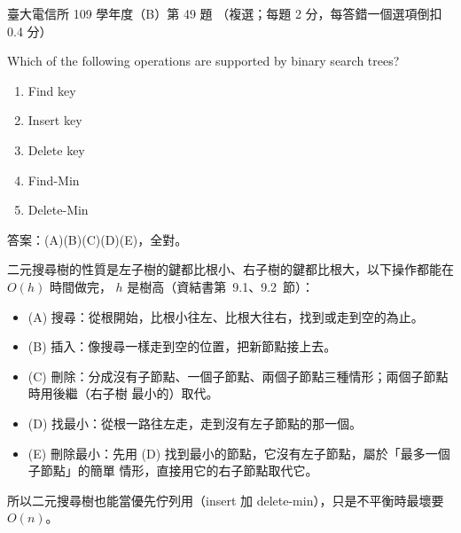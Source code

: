 \begin{pastexam}[label={px:ntu-109-comm-dsa-49}]{臺大電信所 109 學年度（B）第 49 題}
（複選；每題 2 分，每答錯一個選項倒扣 0.4 分）

Which of the following operations are supported by binary search trees?
\begin{enumerate}[label=(\Alph*),nosep]
\item Find key
\item Insert key
\item Delete key
\item Find-Min
\item Delete-Min
\end{enumerate}
\end{pastexam}

\begin{pastsoln}
答案：(A)(B)(C)(D)(E)，全對。

二元搜尋樹的性質是左子樹的鍵都比根小、右子樹的鍵都比根大，以下操作都能在 $O(h)$ 時間做完，
$h$ 是樹高（資結書第~9.1、9.2~節）：
\begin{itemize}
\item (A) 搜尋：從根開始，比根小往左、比根大往右，找到或走到空的為止。
\item (B) 插入：像搜尋一樣走到空的位置，把新節點接上去。
\item (C) 刪除：分成沒有子節點、一個子節點、兩個子節點三種情形；兩個子節點時用後繼（右子樹
最小的）取代。
\item (D) 找最小：從根一路往左走，走到沒有左子節點的那一個。
\item (E) 刪除最小：先用 (D) 找到最小的節點，它沒有左子節點，屬於「最多一個子節點」的簡單
情形，直接用它的右子節點取代它。
\end{itemize}
所以二元搜尋樹也能當優先佇列用（insert 加 delete-min），只是不平衡時最壞要 $O(n)$。
\end{pastsoln}
